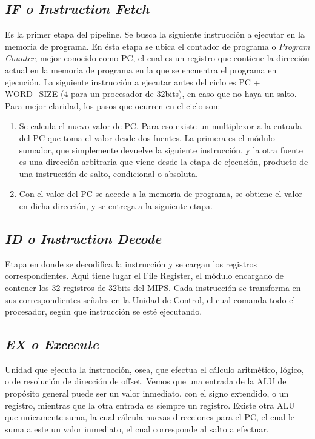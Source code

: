 \documentclass[12pt]{article}
\begin{document}
\subsection{\textit{IF o Instruction Fetch}}
Es la primer etapa del pipeline. Se busca la siguiente instrucción a ejecutar en la memoria de programa. En ésta etapa se ubica el contador de programa o \textit{Program Counter}, mejor conocido como PC, el cual es un registro que contiene la dirección actual en la memoria de programa en la que se encuentra el programa en ejecución. La siguiente instrucción a ejecutar antes del ciclo es PC + WORD\_SIZE (4 para un procesador de 32bits), en caso que no haya un salto. Para mejor claridad, los pasos que ocurren en el ciclo son:

\begin{enumerate}
    \item Se calcula el nuevo valor de PC. Para eso existe un multiplexor a la entrada del PC que toma el valor desde dos fuentes. La primera es el módulo sumador, que simplemente devuelve la siguiente instrucción, y la otra fuente es una dirección arbitraria que viene desde la etapa de ejecución, producto de una instrucción de salto, condicional o absoluta.
    \item Con el valor del PC se accede a la memoria de programa, se obtiene el valor en dicha dirección, y se entrega a la siguiente etapa.
\end{enumerate}

\subsection{\textit{ID o Instruction Decode}}
Etapa en donde se decodifica la instrucción y se cargan los registros correspondientes. Aqui tiene lugar el File Register, el módulo encargado de contener los 32 registros de 32bits del MIPS. Cada instrucción se transforma en sus correspondientes señales en la Unidad de Control, el cual comanda todo el procesador, según que instrucción se esté ejecutando.

\subsection{\textit{EX o Excecute}}
Unidad que ejecuta la instrucción, osea, que efectua el cálculo aritmético, lógico, o de resolución de dirección de offset. Vemos que una entrada de la ALU de propósito general puede ser un valor inmediato, con el signo extendido, o un registro, mientras que la otra entrada es siempre un registro. Existe otra ALU que unicamente suma, la cual cálcula nuevas direcciones para el PC, el cual le suma a este un valor inmediato, el cual corresponde al salto a efectuar.
\end{document}

